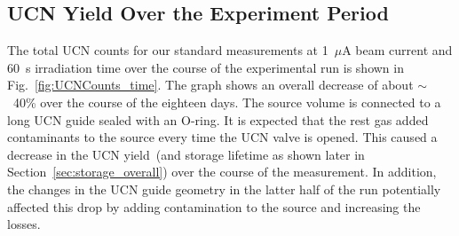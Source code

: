 

\subsection{UCN Yield Over the Experiment Period}

The total UCN counts for our standard measurements at 1~$\mu$A beam
current and 60~s irradiation time over the course of the experimental
run is shown in Fig.~\ref{fig:UCNCounts_time}. The graph shows an
overall decrease of about $\sim$~40\% over the course of the eighteen
days. The source volume is connected to a long UCN guide sealed with
an O-ring. It is expected that the rest gas added contaminants to the
source every time the UCN valve is opened. This caused a decrease in
the UCN yield~(and storage lifetime as shown later in
Section~\ref{sec:storage_overall}) over the course of the
measurement. In addition, the changes in the UCN guide geometry in the
latter half of the run potentially affected this drop by adding
contamination to the source and increasing the losses.


